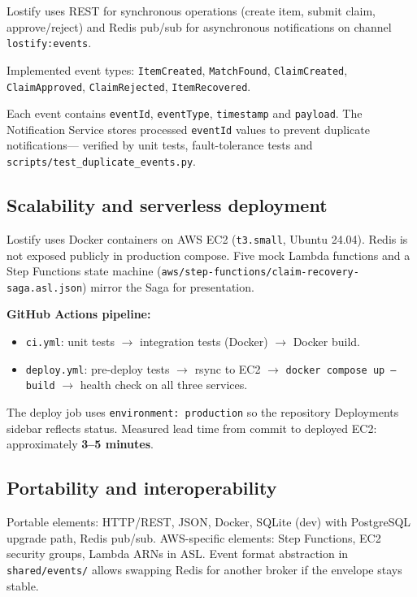 \documentclass[11pt,a4paper]{article}
\begin{document}
Lostify uses REST for synchronous operations (create item, submit claim, approve/reject) and
Redis pub/sub for asynchronous notifications on channel \texttt{lostify:events}.

Implemented event types: \texttt{ItemCreated}, \texttt{MatchFound}, \texttt{ClaimCreated},
\texttt{ClaimApproved}, \texttt{ClaimRejected}, \texttt{ItemRecovered}.

Each event contains \texttt{eventId}, \texttt{eventType}, \texttt{timestamp} and \texttt{payload}.
The Notification Service stores processed \texttt{eventId} values to prevent duplicate notifications---
verified by unit tests, fault-tolerance tests and \texttt{scripts/test\_duplicate\_events.py}.

\subsection{Scalability and serverless deployment}

Lostify uses Docker containers on AWS EC2 (\texttt{t3.small}, Ubuntu 24.04). Redis is not exposed
publicly in production compose. Five mock Lambda functions and a Step Functions state machine
(\texttt{aws/step-functions/claim-recovery-saga.asl.json}) mirror the Saga for presentation.

\textbf{GitHub Actions pipeline:}
\begin{itemize}
    \item \texttt{ci.yml}: unit tests $\rightarrow$ integration tests (Docker) $\rightarrow$ Docker build.
    \item \texttt{deploy.yml}: pre-deploy tests $\rightarrow$ rsync to EC2 $\rightarrow$
    \texttt{docker compose up --build} $\rightarrow$ health check on all three services.
\end{itemize}

The deploy job uses \texttt{environment: production} so the repository Deployments sidebar reflects status.
Measured lead time from commit to deployed EC2: approximately \textbf{3--5 minutes}.

\subsection{Portability and interoperability}

Portable elements: HTTP/REST, JSON, Docker, SQLite (dev) with PostgreSQL upgrade path, Redis pub/sub.
AWS-specific elements: Step Functions, EC2 security groups, Lambda ARNs in ASL.
Event format abstraction in \texttt{shared/events/} allows swapping Redis for another broker if the envelope stays stable.
\end{document}
